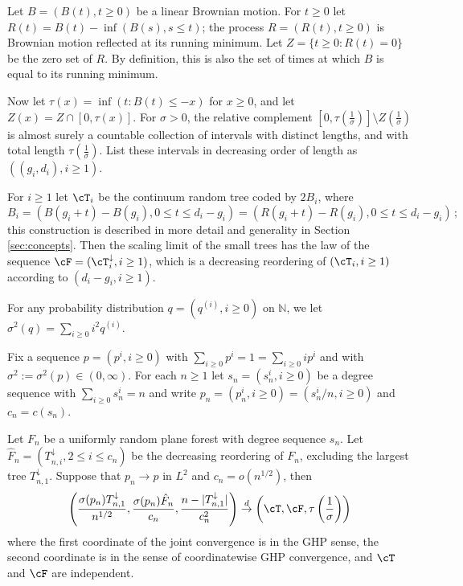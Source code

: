 Let $B=(B(t),t \ge 0)$ be a linear Brownian motion. 
For $t \ge 0$ let $R(t) = B(t) - \inf(B(s),s \le t)$; the process $R=(R(t),t \ge 0)$ is Brownian motion reflected at its running minimum. 
Let $Z = \{t \ge 0: R(t) = 0\}$ be the zero set of $R$.  By definition, this is also the set of times at which $B$ is equal to its running minimum.

Now let $\tau(x) = \inf(t: B(t) \le -x)$ for $x \ge 0$, and let $Z(x) = Z \cap [0,\tau(x)]$. For $\sigma>0$, the relative complement $[0,\tau(\frac{1}{\sigma})]\setminus Z(\frac{1}{\sigma})$ is almost surely a countable collection of intervals with distinct lengths, and with total length $\tau(\frac{1}{\sigma})$. List these intervals in decreasing order of length as $((g_i,d_i),i \ge 1)$. 

For $i \ge 1$ let $\cT_i$ be the continuum random tree coded by $2B_i$, where
\[
B_i = (B(g_i+t)-B(g_i),0 \le t \le d_i-g_i) = (R(g_i+t)-R(g_i),0 \le t \le d_i-g_i)\, ;
\]
this construction is described in more detail and generality in Section \ref{sec:concepts}. Then the scaling limit of the small trees has the law of the sequence $\cF = (\cT^\downarrow_i,i \ge 1)$, which is a decreasing reordering of $(\cT_i, i\ge 1)$ according to $(d_i-g_i, i\ge 1)$. 

For any probability distribution $q=(q^{(i)}, i\ge 0)$ on $\mathbb{N}$, we let $\sigma^2(q)=\sum\limits_{i\ge 0}i^2 q^{(i)}$.
\begin{thm}\label{thm:main} 
Fix a sequence $p=(p^i,i \ge 0)$ with $\sum_{i \ge 0} p^i=1=\sum_{i \ge 0} i p^i$ and with $\sigma^2:=\sigma^2(p) \in (0,\infty)$. 
For each $n \ge 1$ let $s_n = (s_n^i,i \ge 0)$ be a degree sequence with $\sum_{i \ge 0} s_n^i = n$ and write $p_n=(p^i_n,i\ge 0)=(s^i_n/n, i\ge 0)$ and $c_n=c(s_n)$. 

Let $F_n$ be a uniformly random plane forest with degree sequence $s_n$. 
Let $\hat{F}_n=(T_{n,i}^{\downarrow}, 2\le i \le c_n)$ be the decreasing reordering of $F_n$, excluding the largest tree $T^\downarrow_{n,1}$. Suppose that $p_n \to p$ in $L^2$ and $c_n=o(n^{1/2})$, then 
\[
\left(\frac{\sigma(p_n)T^\downarrow_{n,1}}{n^{1/2}}, \frac{\sigma(p_n)\hat{F}_n}{c_n}, \frac{n-|T^\downarrow_{n,1}|}{c^2_n}\right)\overset{d}{\rightarrow}\left(\cT, \cF, \tau\left(\frac{1}{\sigma}\right)\right)
\]
where the first coordinate of the joint convergence is in the GHP sense, the second coordinate is in the sense of coordinatewise GHP convergence, and $\cT$ and $\cF$ are independent.
\end{thm}


